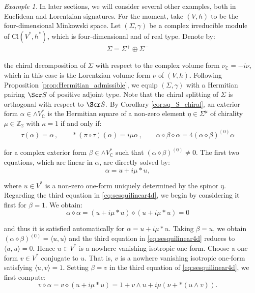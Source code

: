 \documentclass[10pt,a4paper,twoside,reqno]{amsart}
\theoremstyle{plain}
\theoremstyle{definition}
\theoremstyle{remark}
\newtheorem{example}[thm]{Example}
\def\C{\mathbb{C}}
\def\scS{\Scr S}
\def\Cl{\mathrm{Cl}}
\newcommand{\escal}[1]{\langle#1\rangle}
\begin{document}
\begin{example}
In later sections, we will consider several other examples, both in Euclidean and Lorentzian signatures. For the moment, take $(V,h)$ to be the four-dimensional Minkowski space. Let $(\Sigma , \gamma)$ be a complex irreducible module of $\Cl(V^{\ast},h^{\ast})$, which is four-dimensional and of real type. Denote by: 
\begin{eqnarray*}
\Sigma = \Sigma^{+} \oplus \Sigma^{-}
\end{eqnarray*}

\noindent
the chiral decomposition of $\Sigma$ with respect to the complex volume form $\nu_{\C} = -i\nu$, which in this case is the Lorentzian volume form $\nu$ of $(V,h)$. Following Proposition \ref{prop:Hermitian_admissible}, we equip $(\Sigma,\gamma)$ with a Hermitian pairing $\scS$ of positive adjoint type. Note that the chiral splitting of $\Sigma$ is orthogonal with respect to $\scS$. By Corollary \ref{cor:sq_S_chiral}, an exterior form $\alpha \in \wedge V^{\ast}_{\C}$ is the Hermitian square of a non-zero element $\eta\in\Sigma^{\mu}$ of chirality $\mu\in\mathbb{Z}_2$ with $\kappa = 1$ if and only if:
\begin{eqnarray}
\label{eq:sesquilinear4d}
 \tau(\alpha)=   \bar{\alpha}\, ,\qquad   \ast (\pi\circ\tau)(\alpha) = i \mu\alpha\, , \qquad \alpha \diamond \beta \diamond\alpha= 4 (\alpha\diamond\beta)^{(0)}\alpha
\end{eqnarray}

\noindent
for a complex exterior form $\beta\in \wedge V^{\ast}_{\C}$ such that $(\alpha \diamond\beta)^{(0)} \neq 0$. The first two equations, which are linear in $\alpha$, are directly solved by:
\begin{equation*}
\alpha = u + i \mu \ast u,
\end{equation*}

\noindent
where $u\in V^{\ast}$ is a non-zero one-form uniquely determined by the spinor $\eta$. Regarding the third equation in \eqref{eq:sesquilinear4d}, we begin by considering it first for $\beta =1$. We obtain:
\begin{equation*}
\alpha\diamond \alpha = (u + i \mu \ast u)\diamond (u + i \mu \ast u) = 0
\end{equation*}

\noindent
and thus it is satisfied automatically for $\alpha = u + i \mu \ast u$. Taking $\beta = u$, we obtain $(\alpha\diamond \beta)^{(0)}=\escal{u,u}$ and the third equation in \eqref{eq:sesquilinear4d} reduces to $\escal{u,u}=0$. Hence $u\in V^*$ is a nowhere vanishing isotropic one-form. Choose a one-form $v\in V^*$ conjugate to $u$. That is, $v$ is a nowhere vanishing isotropic one-form satisfying $\escal{u,v}=1$. Setting $\beta = v$ in the third equation of \eqref{eq:sesquilinear4d}, we first compute:
\begin{equation*}
v\diamond \alpha = v \diamond (u + i \mu \ast u) = 1 + v\wedge u + i\mu ( \nu + \ast(u\wedge v) ).
\end{equation*}


\end{example}
\end{document}

